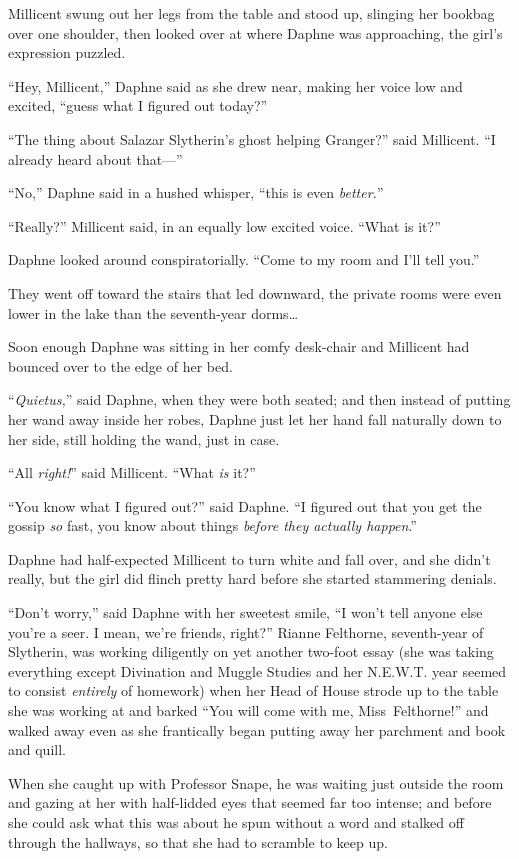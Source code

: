 Millicent swung out her legs from the table and stood up, slinging her bookbag
over one shoulder, then looked over at where Daphne was approaching, the girl’s
expression puzzled.

“Hey, Millicent,” Daphne said as she drew near, making her voice low and
excited, “guess what I figured out today?”

“The thing about Salazar Slytherin’s ghost helping Granger?” said Millicent. “I
already heard about that—”

“No,” Daphne said in a hushed whisper, “this is even \emph{better.}”

“Really?” Millicent said, in an equally low excited voice. “What is it?”

Daphne looked around conspiratorially. “Come to my room and I’ll tell you.”

They went off toward the stairs that led downward, the private rooms were even
lower in the lake than the seventh-year dorms…

Soon enough Daphne was sitting in her comfy desk-chair and Millicent had
bounced over to the edge of her bed.

“\emph{Quietus,}” said Daphne, when they were both seated; and then instead of
putting her wand away inside her robes, Daphne just let her hand fall naturally
down to her side, still holding the wand, just in case.

“All \emph{right!}” said Millicent. “What \emph{is} it?”

“You know what I figured out?” said Daphne. “I figured out that you get the
gossip \emph{so} fast, you know about things \emph{before they actually
happen}.”

Daphne had half-expected Millicent to turn white and fall over, and she didn’t
really, but the girl did flinch pretty hard before she started stammering
denials.

“Don’t worry,” said Daphne with her sweetest smile, “I won’t tell anyone else
you’re a seer. I mean, we’re friends, right?”
\later
Rianne Felthorne, seventh-year of Slytherin, was working diligently on yet
another two-foot essay (she was taking everything except Divination and Muggle
Studies and her N.E.W.T. year seemed to consist \emph{entirely} of homework)
when her Head of House strode up to the table she was working at and barked
“You will come with me, Miss~Felthorne!” and walked away even as she
frantically began putting away her parchment and book and quill.

When she caught up with Professor Snape, he was waiting just outside the room
and gazing at her with half-lidded eyes that seemed far too intense; and before
she could ask what this was about he spun without a word and stalked off
through the hallways, so that she had to scramble to keep up.

